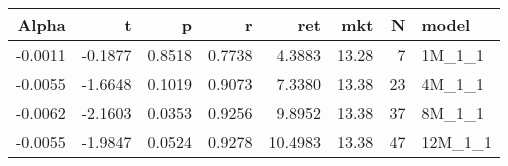 \begin{table}[ht]
\centering
\begin{tabular}{rrrrrrrl}
  \hline
Alpha & t & p & r & ret & mkt & N & model \\ 
  \hline
-0.0011 & -0.1877 & 0.8518 & 0.7738 & 4.3883 & 13.28 & 7 & 1M\_1\_1 \\ 
  -0.0055 & -1.6648 & 0.1019 & 0.9073 & 7.3380 & 13.38 & 23 & 4M\_1\_1 \\ 
  -0.0062 & -2.1603 & 0.0353 & 0.9256 & 9.8952 & 13.38 & 37 & 8M\_1\_1 \\ 
  -0.0055 & -1.9847 & 0.0524 & 0.9278 & 10.4983 & 13.38 & 47 & 12M\_1\_1 \\ 
   \hline
\end{tabular}
\end{table}

